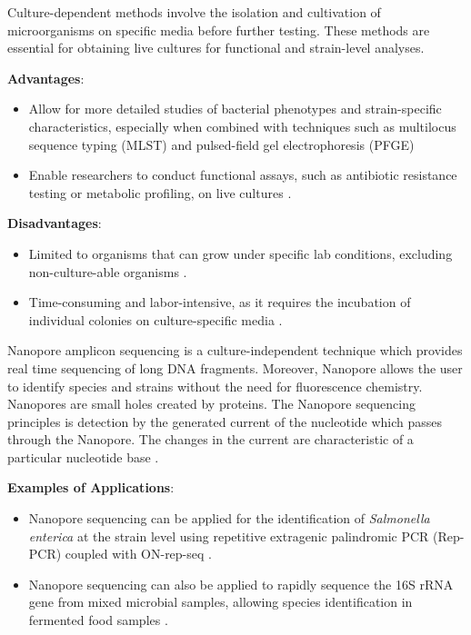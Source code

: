 Culture-dependent methods involve the isolation and cultivation of microorganisms on specific media before further testing. These methods are essential for obtaining live cultures for functional and strain-level analyses.

\textbf{Advantages}:
\begin{itemize}
    \item Allow for more detailed studies of bacterial phenotypes and strain-specific characteristics, especially when combined with techniques such as multilocus sequence typing (MLST) and pulsed-field gel electrophoresis (PFGE) \cite*{L5-DNAEnrichment}
    \item Enable researchers to conduct functional assays, such as antibiotic resistance testing or metabolic profiling, on live cultures \cite*{L3-SeqBasedClass}.
\end{itemize}

\textbf{Disadvantages}:
\begin{itemize}
    \item Limited to organisms that can grow under specific lab conditions, excluding non-culture-able organisms \cite*{L5-HighThroughput}.
    \item Time-consuming and labor-intensive, as it requires the incubation of individual colonies on culture-specific media \cite*{L5-DNAEnrichment}.
\end{itemize}

Nanopore amplicon sequencing is a culture-independent technique which provides real time sequencing of long DNA fragments. Moreover, Nanopore allows the user to identify species and strains without the need for fluorescence chemistry. 
Nanopores are small holes created by proteins. The Nanopore sequencing principles is detection by the generated current of the nucleotide which passes through the Nanopore. The changes in the current are characteristic of a particular nucleotide base \cite*{LS10,L3-SeqBasedClass}.

\textbf{Examples of Applications}:
\begin{itemize}
    \item Nanopore sequencing can be applied for the identification of \textit{Salmonella enterica} at the strain level using repetitive extragenic palindromic PCR (Rep-PCR) coupled with ON-rep-seq \cite*{L5-DNAEnrichment}.
    \item Nanopore sequencing can also be applied to rapidly sequence the 16S rRNA gene from mixed microbial samples, allowing species identification in fermented food samples \cite*{L3-SeqBasedClass}.
\end{itemize}


